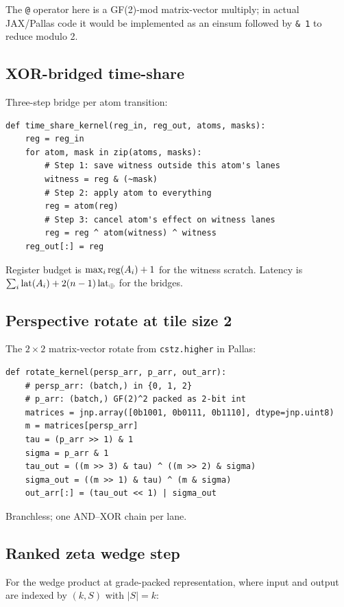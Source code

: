 The \texttt{@} operator here is a GF(2)-mod
matrix-vector multiply; in actual JAX/Pallas code
it would be implemented as an einsum followed by
\texttt{\& 1} to reduce modulo 2.

\subsection{XOR-bridged time-share}

Three-step bridge per atom transition:

\begin{lstlisting}
def time_share_kernel(reg_in, reg_out, atoms, masks):
    reg = reg_in
    for atom, mask in zip(atoms, masks):
        # Step 1: save witness outside this atom's lanes
        witness = reg & (~mask)
        # Step 2: apply atom to everything
        reg = atom(reg)
        # Step 3: cancel atom's effect on witness lanes
        reg = reg ^ atom(witness) ^ witness
    reg_out[:] = reg
\end{lstlisting}

Register budget is $\max_i \operatorname{reg}(A_i) + 1$ for the
witness scratch. Latency is $\sum_i \operatorname{lat}(A_i) +
2(n-1) \operatorname{lat}_\oplus$ for the bridges.

\subsection{Perspective rotate at tile size 2}

The $2 \times 2$ matrix-vector rotate from
\texttt{cstz.higher} in Pallas:

\begin{lstlisting}
def rotate_kernel(persp_arr, p_arr, out_arr):
    # persp_arr: (batch,) in {0, 1, 2}
    # p_arr: (batch,) GF(2)^2 packed as 2-bit int
    matrices = jnp.array([0b1001, 0b0111, 0b1110], dtype=jnp.uint8)
    m = matrices[persp_arr]
    tau = (p_arr >> 1) & 1
    sigma = p_arr & 1
    tau_out = ((m >> 3) & tau) ^ ((m >> 2) & sigma)
    sigma_out = ((m >> 1) & tau) ^ (m & sigma)
    out_arr[:] = (tau_out << 1) | sigma_out
\end{lstlisting}

Branchless; one AND--XOR chain per lane.

\subsection{Ranked zeta wedge step}

For the wedge product at grade-packed
representation, where input and output are indexed
by $(k, S)$ with $|S| = k$:

